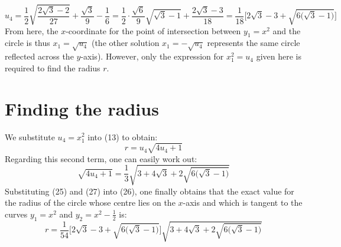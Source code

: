 \documentclass{article}
\begin{document}
\begin{equation*}
    \tag{25} u_4=\frac{1}{2}\sqrt{\frac{2\sqrt{3}-2}{27}}+\frac{\sqrt{3}}{9}-\frac{1}{6}=\frac{1}{2}\cdot\frac{\sqrt{6}}{9}\sqrt{\sqrt{3}-1}+\frac{2\sqrt{3}-3}{18}= \frac{1}{18}\bigg[2\sqrt{3}-3+\sqrt{6\big(\sqrt{3}-1\big)}\bigg]
\end{equation*}
From here, the $x$-coordinate for the point of intersection between $y_1=x^2$ and the circle is thus $x_1=\sqrt{u_4}$ (the other solution $x_1=-\sqrt{u_4}$ represents the same circle reflected across the $y$-axis). However, only the expression for $x_1^2=u_4$ given here is required to find the radius $r$.
\section{Finding the radius}
We substitute $u_4=x_1^2$ into (13) to obtain:
\begin{equation}
    \tag{26} r= u_4\sqrt{4u_4+1}
\end{equation}
Regarding this second term, one can easily work out:
\begin{equation*}
    \tag{27} \sqrt{4u_4+1}=\frac{1}{3}\sqrt{3+4\sqrt{3}+2\sqrt{6\big(\sqrt{3}-1\big)}}
\end{equation*}
Substituting (25) and (27) into (26), one finally obtains that the exact value for the radius of the circle whose centre lies on the $x$-axis and which is tangent to the curves $y_1=x^2$ and $y_2=x^2-\frac{1}{2}$ is:
\begin{equation*}
    \tag{28} r=\frac{1}{54}\bigg[2\sqrt3-3+\sqrt{6\big(\sqrt{3}-1\big)}\bigg]\sqrt{3+4\sqrt{3}+2\sqrt{6\big(\sqrt{3}-1\big)}}
\end{equation*}
\end{document}
